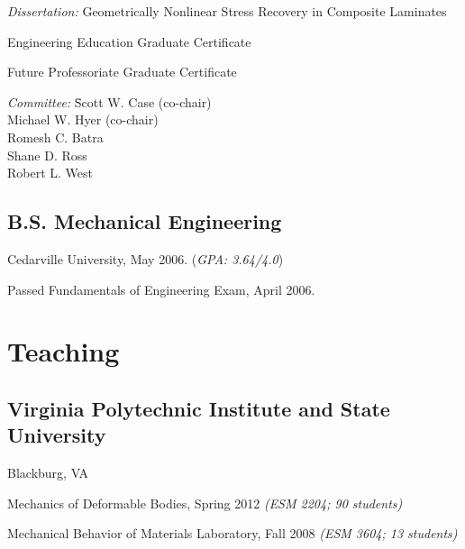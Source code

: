 \documentclass[10pt,letterpaper]{article}
\def\vpisu{Virginia Polytechnic Institute and State University}
\renewenvironment{itemize}{
  \begin{list}{}{
    \setlength{\leftmargin}{30pt}
    \setlength{\itemsep}{0.2em}
    \setlength{\parskip}{0pt}
    \setlength{\parsep}{0.25em}
  }
}{
  \end{list}
}
\begin{document}
\begin{itemize}
\item \textit{Dissertation:} Geometrically Nonlinear Stress Recovery in Composite Laminates
\item Engineering Education Graduate Certificate 
\item Future Professoriate Graduate Certificate
\item
  \begin{tabbing}
    \textit{Committee:} \= Scott W. Case (co-chair) \\
    \> Michael W. Hyer (co-chair) \\
    \> Romesh C. Batra \\
    \> Shane D. Ross \\
    \> Robert L. West
  \end{tabbing}
\end{itemize}

\subsection*{B.S. Mechanical Engineering}
Cedarville University, May 2006.
(\emph{GPA: 3.64/4.0})
\begin{itemize}
\item Passed Fundamentals of Engineering Exam, April 2006.
\end{itemize}

\section*{Teaching}

\titleformat{\subsection}[runin]{\large \it}{}{0pt}{}[\hfill\ ]

\subsection*{\vpisu}
Blackburg, VA

\begin{itemize}
\item Mechanics of Deformable Bodies, Spring 2012
  \emph{(ESM 2204; 90 students)}
\item Mechanical Behavior of Materials Laboratory, Fall 2008
  \emph{(ESM 3604; 13 students)}
\end{itemize}
\end{document}
